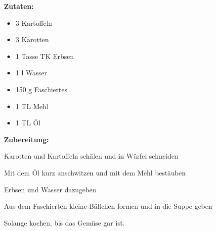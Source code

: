 

\textbf {Zutaten:} \\
\begin{itemize}
	\item 3 Kartoffeln
	\item 3 Karotten
	\item 1 Tasse TK Erbsen
	\item 1 l Wasser
	\item 150 g Faschiertes
	\item 1 TL Mehl
	\item 1 TL Öl
\end{itemize}

\vspace* {2cm}

\textbf {Zubereitung:} \\
\begin{compactenum}
	\item Karotten und Kartoffeln schälen und in Würfel schneiden
	\item Mit dem Öl kurz anschwitzen und mit dem Mehl bestäuben
	\item Erbsen und Wasser dazugeben
	\item Aus dem Faschierten kleine Bällchen formen und in die Suppe geben
	\item Solange kochen, bis das Gemüse gar ist.
\end{compactenum}


